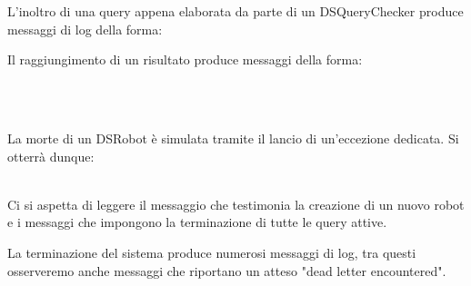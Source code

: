 L'inoltro di una query appena elaborata da parte di un DSQueryChecker produce
messaggi di log della forma:

Il raggiungimento di un risultato produce messaggi della forma:

\\
\\

La morte di un DSRobot è simulata tramite il lancio di un'eccezione dedicata. Si otterrà dunque:\\
\\

Ci si aspetta di leggere il messaggio che testimonia la creazione di un nuovo robot
e i messaggi che impongono la terminazione di tutte le query attive.\\

La terminazione del sistema produce numerosi messaggi di log, tra questi
osserveremo anche messaggi che riportano un atteso "dead letter encountered".
